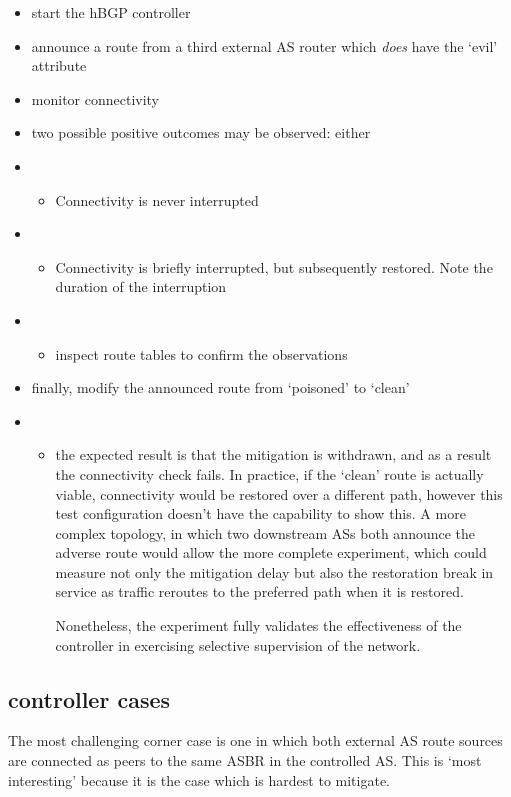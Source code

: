 \begin{itemize}
    \item start the hBGP controller
    \item announce a route from a third external AS router which \textit{does} have the `evil' attribute
    \item monitor connectivity
    \item two possible positive outcomes may be observed:
    either
    \item \begin{itemize}
        \item Connectivity is never interrupted
    \end{itemize}
    \item \begin{itemize}
        \item Connectivity is briefly interrupted, but subsequently restored.  Note the duration of the interruption
    \end{itemize}
    \item \begin{itemize}
        \item inspect route tables to confirm the observations
    \end{itemize}
    \item finally, modify the announced route from `poisoned' to `clean'
    \item \begin{itemize}
        \item the expected result is that the mitigation is withdrawn, and as a result the connectivity check fails.
        In practice, if the `clean' route is actually viable, connectivity would be restored over a different path, however this test configuration doesn't have the capability to show this.  A more complex topology, in which two downstream ASs both announce the adverse route would allow the more complete experiment, which could measure not only the mitigation delay but also the restoration break in service as traffic reroutes to the preferred path when it is restored.

        Nonetheless, the experiment fully validates the effectiveness of the controller in exercising selective supervision of the network.
    \end{itemize}
\end{itemize}

\subsection{controller cases}
The most challenging corner case is one in which both external AS route sources are connected as peers to the same ASBR in the controlled AS.  This is `most interesting' because it is the case which is hardest to mitigate.

